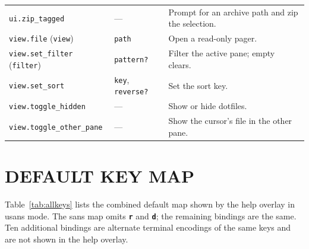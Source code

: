 \documentclass[tm]{ornltm}
\newcommand{\key}[1]{\textbf{\texttt{#1}}}
\begin{document}
\begin{small}
\begin{longtable}{p{} p{} p{}}
  \texttt{ui.zip\_tagged} & --- & Prompt for an archive path and zip the
    selection. \\
  \texttt{view.file} (\texttt{view}) & \texttt{path} & Open a read-only
    pager. \\
  \texttt{view.set\_filter} (\texttt{filter}) & \texttt{pattern?} & Filter the
    active pane; empty clears. \\
  \texttt{view.set\_sort} & \texttt{key}, \texttt{reverse?} & Set the sort
    key. \\
  \texttt{view.toggle\_hidden} & --- & Show or hide dotfiles. \\
  \texttt{view.toggle\_\allowbreak{}other\_pane} & --- & Show the cursor's file in the other
    pane. \\
\end{longtable}
\end{small}

\section{DEFAULT KEY MAP}
\label{sec:appkeys}

Table~\ref{tab:allkeys} lists the combined default map shown by the help overlay
in \ac{usans} mode. The \ac{sans} map omits \key{r} and \key{d}; the remaining
bindings are the same. Ten additional bindings are alternate terminal encodings
of the same keys and are not shown in the help overlay.
\end{document}
